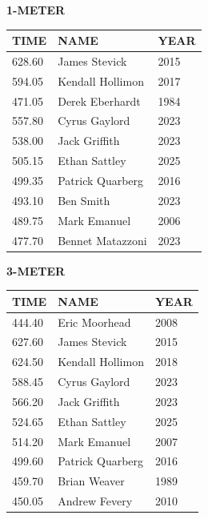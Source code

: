 \begin{table}[H]
\centering
\begin{minipage}[t]{0.6\textwidth}
\centering
\textbf{1-METER}\\[0.1cm]
\begin{tabular}{@{}p{1.8cm}p{2.8cm}p{1.2cm}@{}}
\hline
    \textbf{TIME} & \textbf{NAME} & \textbf{YEAR} \\
\hline
    628.60 & James Stevick & 2015 \\
    594.05 & Kendall Hollimon & 2017 \\
    471.05 & Derek Eberhardt & 1984 \\
    557.80 & Cyrus Gaylord & 2023 \\
    538.00 & Jack Griffith & 2023 \\
    505.15 & Ethan Sattley & 2025 \\
    499.35 & Patrick Quarberg & 2016 \\
    493.10 & Ben Smith & 2023 \\
    489.75 & Mark Emanuel & 2006 \\
    477.70 & Bennet Matazzoni & 2023 \\
\hline
\end{tabular}
\end{minipage}
\end{table}

\begin{table}[H]
\centering
\begin{minipage}[t]{0.6\textwidth}
\centering
\textbf{3-METER}\\[0.1cm]
\begin{tabular}{@{}p{1.8cm}p{2.8cm}p{1.2cm}@{}}
\hline
    \textbf{TIME} & \textbf{NAME} & \textbf{YEAR} \\
\hline
    444.40 & Eric Moorhead & 2008 \\
    627.60 & James Stevick & 2015 \\
    624.50 & Kendall Hollimon & 2018 \\
    588.45 & Cyrus Gaylord & 2023 \\
    566.20 & Jack Griffith & 2023 \\
    524.65 & Ethan Sattley & 2025 \\
    514.20 & Mark Emanuel & 2007 \\
    499.60 & Patrick Quarberg & 2016 \\
    459.70 & Brian Weaver & 1989 \\
    450.05 & Andrew Fevery & 2010 \\
\hline
\end{tabular}
\end{minipage}
\end{table}

